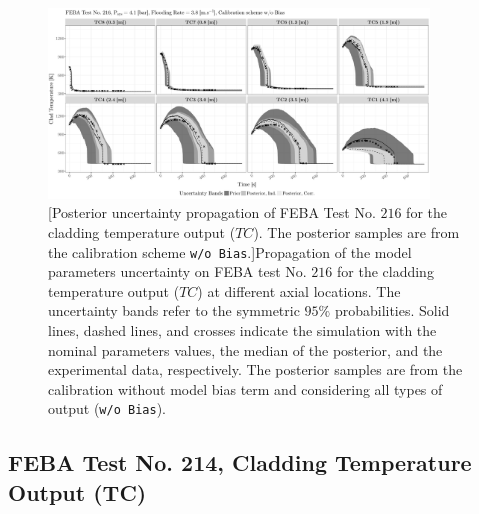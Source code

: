 \clearpage
\begin{figure}
	\centering
	\includegraphics[width=0.90\textwidth]{../figures/chapter5/figures/plotTraceUQPosteriorAllNoDiscNoBCTC216}
		[Posterior uncertainty propagation of FEBA Test No. $216$ for the cladding temperature output ($TC$). The posterior samples are from the calibration scheme \texttt{w/o Bias}.]{Propagation of the model parameters uncertainty on FEBA test No. $216$ for the cladding temperature output ($TC$) at different axial locations. The uncertainty bands refer to the symmetric $95\%$ probabilities. Solid lines, dashed lines, and crosses indicate the simulation with the nominal parameters values, the median of the posterior, and the experimental data, respectively. The posterior samples are from the calibration without model bias term and considering all types of output (\texttt{w/o Bias}).}
	\label{fig:ch5_plot_trace_uq_post_tc_216_nodisc}
\end{figure}
\clearpage

\subsection{FEBA Test No. 214, Cladding Temperature Output (TC)}\label{app:tbl_results_uq_post_tc_214}

